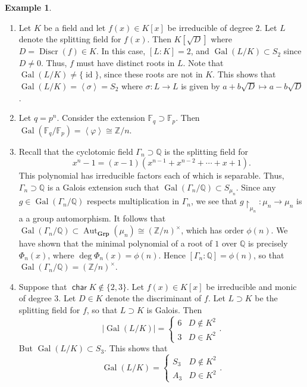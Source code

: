 \documentclass[10pt,letterpaper,cm]{nupset}
\theoremstyle{definition}
\newtheorem{exmp}[definition]{Example}
\theoremstyle{theorem}
\theoremstyle{remark}
\newcommand{\F}{\mathbb F}
\newcommand{\Q}{\mathbb Q}
\newcommand{\Z}{\mathbb Z}
\newcommand{\1}{\mathbf{1}}
\newcommand{\0}{\vec 0}
\DeclareMathOperator{\Char}{\mathsf{char}}
\DeclareMathOperator{\id}{id}
\DeclareMathOperator{\gal}{Gal}
\DeclareMathOperator{\aut}{Aut}
\DeclareMathOperator{\disc}{Discr}
\begin{document}
\begin{exmp} $ $
\begin{enumerate}
\item Let $K$ be a field and let $f(x) \in K[x]$ be irreducible of degree $2$. Let $L$ denote the splitting field for $f(x)$. Then $K\left[\sqrt{D}\right]$ where $D = \disc(f) \in K$. In this case, $[L:K] = 2$, and $\gal(L/K) \subset S_2$ since $D \ne 0$. Thus, $f$ must have distinct roots in $L$. Note that $\gal(L/K) \ne \{\id\}$, since these roots are not in $K$. This shows that $\gal(L/K) = \left\langle \sigma \right\rangle = S_2$ where $\sigma : L \to L$ is given by $a + b \sqrt{D} \mapsto a-b \sqrt{D}$.
\item Let $q=p^n$. Consider the extension $\F_q \supset \F_p$. Then $\gal(\F_q/\F_p) = \left\langle \varphi \right\rangle \cong \Z/n$.
\item Recall that the cyclotomic field $\Gamma_n \supset \Q$ is the splitting field for $$x^n-1 = \left(x-1\right)\left(x^{n-1} + x^{n-2} + \cdots + x + 1\right).$$ This polynomial has irreducible factors each of which is separable. Thus, $\Gamma_n \supset \Q$ is a Galois extension such that $\gal(\Gamma_n / \Q) \subset S_{\mu_n}$. Since any $g \in \gal(\Gamma_n/\Q)$ respects multiplication in $\Gamma_n$, we see that $g \restriction_{\mu_n} : \mu_n \to \mu_n$ is a a group automorphism. It follows that $\gal(\Gamma_n / \Q) \subset \aut_{\mathbf{Grp}}(\mu_n) \cong (\Z/n)^{\times}$, which has order $\phi(n)$.   We have shown that the minimal polynomial of a root of $1$ over $\Q$ is precisely $\Phi_n(x)$, where $\deg{\Phi_n(x)} = \phi(n)$. Hence $\left[\Gamma_n : \Q\right]= \phi(n)$, so that $\gal(\Gamma_n / \Q) = \left(\Z/n\right)^{\times}$.
\item Suppose that $\Char{K} \notin \{2,3\}$. Let $f(x) \in K[x]$ be irreducible and monic of degree $3$. Let $D \in K$ denote the discriminant of $f$. Let $L \supset K$ be the splitting field for $f$, so that $L \supset K$ is Galois. Then $$\left\lvert{\gal(L/K)}\right\rvert = \begin{cases} 6 & D \notin K^2  \\ 3 & D \in K^2    \end{cases}.$$ But $\gal(L/K) \subset S_3$. This shows that $$\gal(L/K) = \begin{cases} S_3 & D \notin K^2  \\ A_3 & D \in K^2    \end{cases}.$$
\end{enumerate}
\end{exmp}
\end{document}
